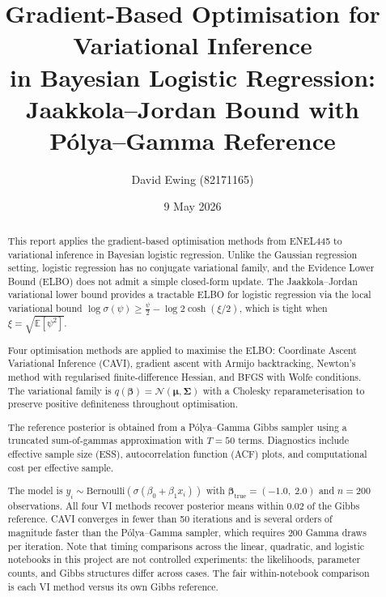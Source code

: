 \documentclass[11pt,a4paper]{article}
\title{
Gradient-Based Optimisation for Variational Inference\\
in Bayesian Logistic Regression:\\
Jaakkola--Jordan Bound with P\'{o}lya--Gamma Reference
}
\author{
  David Ewing (82171165)
}
\date{9 May 2026}
\newcommand{\E}{\mathbb{E}}
\newcommand{\N}{\mathcal{N}}
\begin{document}
\maketitle

\begin{abstract}
\setlength{\parindent}{0pt}
\setlength{\parskip}{0.7em}

This report applies the gradient-based optimisation methods from ENEL445 to variational
inference in Bayesian logistic regression.
Unlike the Gaussian regression setting, logistic regression has no conjugate variational
family, and the Evidence Lower Bound (ELBO) does not admit a simple closed-form update.
The Jaakkola--Jordan \parencite{Jaakkola2000} variational lower bound provides a tractable
ELBO for logistic regression via the local variational bound $\log\sigma(\psi) \geq
\tfrac{\psi}{2} - \log 2\cosh(\xi/2)$, which is tight when $\xi = \sqrt{\E[\psi^2]}$.

Four optimisation methods are applied to maximise the ELBO:
Coordinate Ascent Variational Inference (CAVI), gradient ascent with Armijo backtracking,
Newton's method with regularised finite-difference Hessian, and BFGS with Wolfe conditions.
The variational family is $q(\bm{\beta}) = \N(\bm{\mu},\bm{\Sigma})$ with a
Cholesky reparameterisation to preserve positive definiteness throughout optimisation.

The reference posterior is obtained from a P\'{o}lya--Gamma Gibbs sampler
\parencite{Polson2013} using a truncated sum-of-gammas approximation with $T=50$ terms.
Diagnostics include effective sample size (ESS), autocorrelation function (ACF) plots,
and computational cost per effective sample.

The model is $y_i \sim \mathrm{Bernoulli}(\sigma(\beta_0 + \beta_1 x_i))$
with $\bm{\beta}_{\mathrm{true}} = (-1.0,\; 2.0)$ and $n=200$ observations.
All four VI methods recover posterior means within $0.02$ of the Gibbs reference.
CAVI converges in fewer than 50 iterations and is several orders of magnitude faster
than the P\'{o}lya--Gamma sampler, which requires $200$ Gamma draws per iteration.
Note that timing comparisons across the linear, quadratic, and logistic notebooks
in this project are not controlled experiments: the likelihoods, parameter counts,
and Gibbs structures differ across cases.
The fair within-notebook comparison is each VI method versus its own Gibbs reference.
\end{abstract}

\newpage

\end{document}

